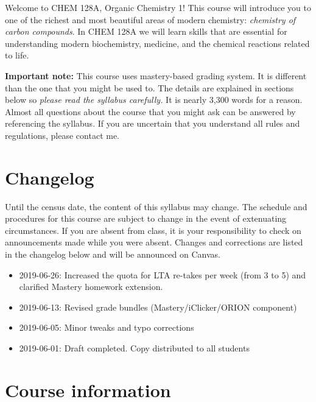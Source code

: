 \newpage

Welcome to CHEM 128A, Organic Chemistry 1! This course will introduce
you to one of the richest and most beautiful areas of modern chemistry:
\emph{chemistry of carbon compounds}. In CHEM 128A we will learn skills
that are essential for understanding modern biochemistry, medicine, and
the chemical reactions related to life.

\textbf{Important note:} This course uses mastery-based grading system.
It is different than the one that you might be used to. The details are
explained in sections below so \emph{please read the syllabus
carefully.} It is nearly 3,300 words for a reason. Almost all questions
about the course that you might ask can be answered by referencing the
syllabus. If you are uncertain that you understand all rules and
regulations, please contact me.

\hypertarget{changelog}{%
\section{Changelog}\label{changelog}}

Until the census date, the content of this syllabus may change. The
schedule and procedures for this course are subject to change in the
event of extenuating circumstances. If you are absent from class, it is
your responsibility to check on announcements made while you were
absent. Changes and corrections are listed in the changelog below and
will be announced on Canvas.

\begin{itemize}
\tightlist
\item
  2019-06-26: Increased the quota for LTA re-takes per week (from 3 to
  5) and clarified Mastery homework extension.
\item
  2019-06-13: Revised grade bundles (Mastery/iClicker/ORION component)
\item
  2019-06-05: Minor tweaks and typo corrections
\item
  2019-06-01: Draft completed. Copy distributed to all students
\end{itemize}

\hypertarget{course-information}{%
\section{Course information}\label{course-information}}

